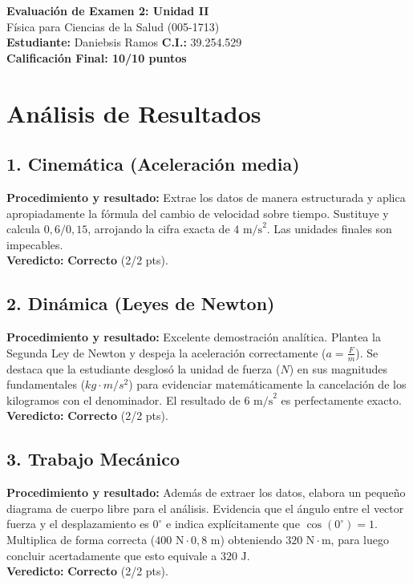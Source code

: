\documentclass[12pt,letterpaper]{article}
\begin{document}
\begin{center}
    \Large \textbf{Evaluación de Examen 2: Unidad II} \\
    \large Física para Ciencias de la Salud (005-1713) \\
    \vspace{0.5cm}
    \textbf{Estudiante:} Daniebsis Ramos \quad \textbf{C.I.:} 39.254.529
    \vspace{0.3cm} \\
    \large \textbf{Calificación Final: 10/10 puntos}
\end{center}

\vspace{0.5cm}

\section*{Análisis de Resultados}

\subsection*{1. Cinemática (Aceleración media)}
\textbf{Procedimiento y resultado:} Extrae los datos de manera estructurada y aplica apropiadamente la fórmula del cambio de velocidad sobre tiempo. Sustituye y calcula $0,6 / 0,15$, arrojando la cifra exacta de $4 \text{ m/s}^2$. Las unidades finales son impecables. \\
\textbf{Veredicto:} \textbf{Correcto} (2/2 pts).

\subsection*{2. Dinámica (Leyes de Newton)}
\textbf{Procedimiento y resultado:} Excelente demostración analítica. Plantea la Segunda Ley de Newton y despeja la aceleración correctamente ($a = \frac{F}{m}$). Se destaca que la estudiante desglosó la unidad de fuerza ($N$) en sus magnitudes fundamentales ($kg \cdot m/s^2$) para evidenciar matemáticamente la cancelación de los kilogramos con el denominador. El resultado de $6 \text{ m/s}^2$ es perfectamente exacto. \\
\textbf{Veredicto:} \textbf{Correcto} (2/2 pts).

\subsection*{3. Trabajo Mecánico}
\textbf{Procedimiento y resultado:} Además de extraer los datos, elabora un pequeño diagrama de cuerpo libre para el análisis. Evidencia que el ángulo entre el vector fuerza y el desplazamiento es $0^\circ$ e indica explícitamente que $\cos(0^\circ) = 1$. Multiplica de forma correcta ($400 \text{ N} \cdot 0,8 \text{ m}$) obteniendo $320 \text{ N}\cdot\text{m}$, para luego concluir acertadamente que esto equivale a $320 \text{ J}$. \\
\textbf{Veredicto:} \textbf{Correcto} (2/2 pts).
\end{document}
